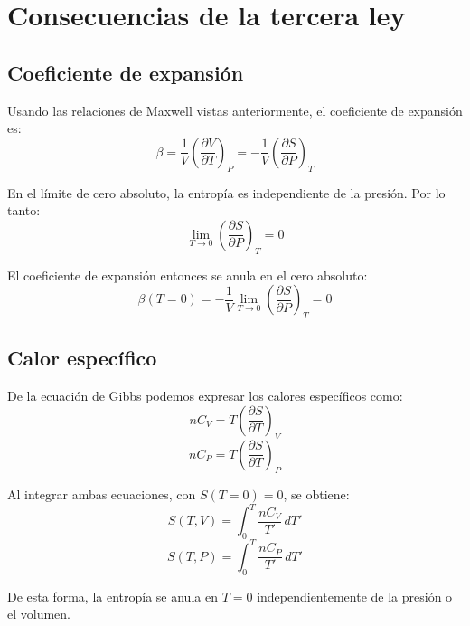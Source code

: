\section{Consecuencias de la tercera ley}

\subsection{Coeficiente de expansión}
Usando las relaciones de Maxwell vistas anteriormente, el coeficiente de expansión es:
\begin{equation}
\beta = \frac{1}{V}\left( \frac{\partial V}{\partial T} \right)_P = -\frac{1}{V}\left( \frac{\partial S}{\partial P} \right)_T
\end{equation}

En el límite de cero absoluto, la entropía es independiente de la presión. Por lo tanto:
\begin{equation}
\lim_{T\to 0} \left(\frac{\partial S}{\partial P} \right)_T = 0
\end{equation}

El coeficiente de expansión entonces se anula en el cero absoluto:
\begin{equation}
\beta(T=0) = -\frac{1}{V}\lim_{T\to 0} \left(\frac{\partial S}{\partial P}\right)_T = 0
\end{equation}

\subsection{Calor específico}
De la ecuación de Gibbs podemos expresar los calores específicos como:
\begin{equation}
nC_V = T\left(\frac{\partial S}{\partial T}\right)_V
\end{equation}
\begin{equation}
nC_P = T\left(\frac{\partial S}{\partial T}\right)_P
\end{equation}

Al integrar ambas ecuaciones, con $S(T=0)=0$, se obtiene:
\begin{equation}
S(T,V) = \int_0^T \frac{nC_V}{T'}\,dT'
\end{equation}
\begin{equation}
S(T,P) = \int_0^T \frac{nC_P}{T'}\,dT'
\end{equation}

De esta forma, la entropía se anula en $T=0$ independientemente de la presión o el volumen.
